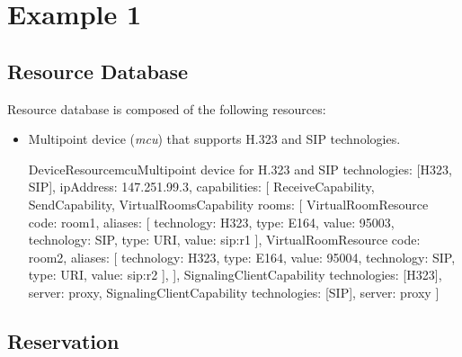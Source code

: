 \section{Example 1}


\subsection{Resource Database}

Resource database is composed of the following resources:
\begin{itemize}

\item Multipoint device (\emph{mcu}) that supports H.323 and SIP 
  technologies.
  
\begin{EntityExample}{DeviceResource}{mcu}{Multipoint device for H.323 and SIP}
technologies: [H323, SIP], 
ipAddress: 147.251.99.3,
capabilities: [
  ReceiveCapability, SendCapability,
  VirtualRoomsCapability {rooms: [
    VirtualRoomResource {code: room1, aliases: [
      {technology: H323, type: E164, value: 95003},
      {technology: SIP, type: URI, value: sip:r1}
    ]},
    VirtualRoomResource {code: room2, aliases: [
      {technology: H323, type: E164, value: 95004},
      {technology: SIP, type: URI, value: sip:r2}
    ]},
  ]},
  SignalingClientCapability {technologies: [H323], server: proxy},
  SignalingClientCapability {technologies: [SIP], server: proxy}
]
\end{EntityExample}

\end{itemize}

\subsection{Reservation}

 \\
 \\
